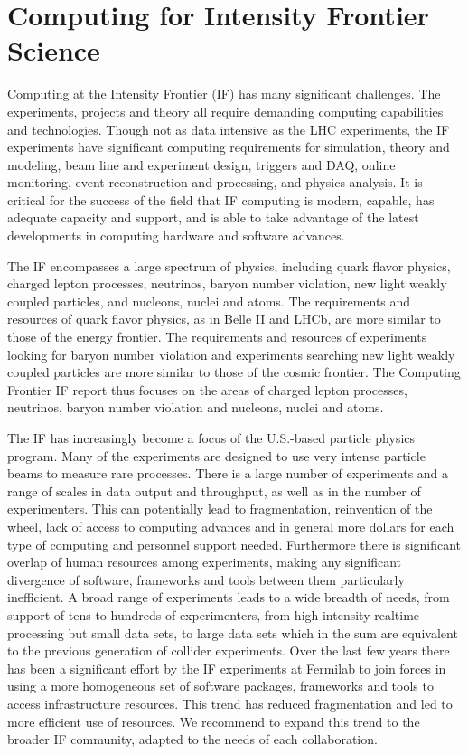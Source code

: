 \section{Computing for Intensity Frontier Science}

Computing at the Intensity Frontier (IF) has many significant challenges. The
experiments, projects and theory all require demanding computing capabilities
and technologies.  Though not as data intensive as the LHC experiments, the IF
experiments have significant computing requirements for simulation,  theory
and modeling, beam line and experiment design, triggers and DAQ, online
monitoring, event reconstruction and processing, and physics analysis.  It is
critical for the success of the field that IF computing is modern, capable,
has adequate capacity and support, and is able to take advantage of the latest
developments in computing hardware and software advances.

The IF encompasses a large spectrum of physics, including quark flavor
physics,  charged lepton processes, neutrinos, baryon number violation,  new
light weakly coupled particles, and nucleons, nuclei and atoms.  The
requirements and resources of quark flavor physics, as in Belle II and LHCb,
are more similar to those of the energy frontier. The requirements and
resources of  experiments looking for baryon number violation and  experiments
searching new light weakly coupled particles are more similar to  those of the
cosmic frontier.  The Computing Frontier IF report thus focuses on the areas
of charged lepton processes,  neutrinos, baryon number violation and nucleons,
nuclei and atoms.

The IF has increasingly become a focus of the U.S.-based particle physics program. Many  of
the experiments are designed to use very intense particle beams to measure
rare processes. There is a large number of experiments and a range of scales
in data output and throughput, as well as in the number of experimenters.
This can potentially lead to fragmentation, reinvention of the wheel, lack of
access to computing advances and in general more dollars for each type of
computing and personnel support needed. Furthermore there is significant
overlap of human resources among experiments, making any significant
divergence of  software, frameworks and tools between them particularly
inefficient.  A broad range of experiments leads to a wide breadth of needs,
from support of tens to hundreds of experimenters, from high intensity
realtime processing but small data sets, to large data sets which in the sum
are equivalent to the previous generation of collider experiments. Over the
last few years there has been a significant effort by the IF experiments at
Fermilab to join forces in using a more homogeneous set of software packages,
frameworks and tools to access infrastructure resources. This trend has
reduced fragmentation and led to more efficient use of resources. We recommend
to expand this trend to the broader IF community, adapted to the needs of each
collaboration.

